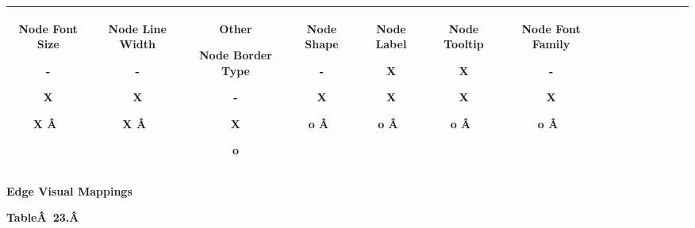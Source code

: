 \begin{tabular}{|c|c|c|c|c|c|c|c|c|c|c|c|c|c|c|}
  Node Font Size 


  - 


  X 


  X 
\^A  &

  Node Line Width 


  - 


  X 


  X 
\^A  &

 Other


  Node Border Type 


  - 


  X 


  o 
 &

  Node Shape 


  - 


  X 


  o 
\^A  &

  Node Label 


  X 


  X 


  o 
\^A  &

  Node Tooltip 


  X 


  X 


  o 
\^A  &

  Node Font Family 


  - 


  X 


  o 
\^A  \\
 \hline 

\end{tabular}



 \textbf{Edge Visual Mappings}



 \textbf{Table\^A 23.\^A }



